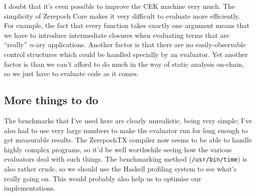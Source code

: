 \documentclass[a4paper]{article}
\begin{document}
I doubt that it's even possible to improve the CEK machine very much.
The simplicity of Zerepoch Core makes it very difficult to evaluate more
efficiently.  For example, the fact that every function takes exactly
one argument means that we have to introduce intermediate closures
when evaluating terms that are ``really'' $n$-ary applications.  Another
factor is that there are no easily-observable control structures which
could be handled specially by an evaluator.  Yet another factor is
than we can't afford to do much in the way of static analysis on-chain,
so we just have to evaluate code as it comes.

\subsection{More things to do}
The benchmarks that I've used here are clearly unrealistic, being very
simple; I've also had to use very large numbers to make the evaluator
run for long enough to get measurable results. The ZerepochTX compiler
now seems to be able to handle highly complex programs, so it'd be
well worthwhile seeing how the various evaluators deal with such
things.  The benchmarking method (\texttt{/usr/bin/time}) is also
rather crude, so we should use the Haskell profiling system to see
what's really going on.  This would probably also help us to optimise
our implementations.




\end{document}
